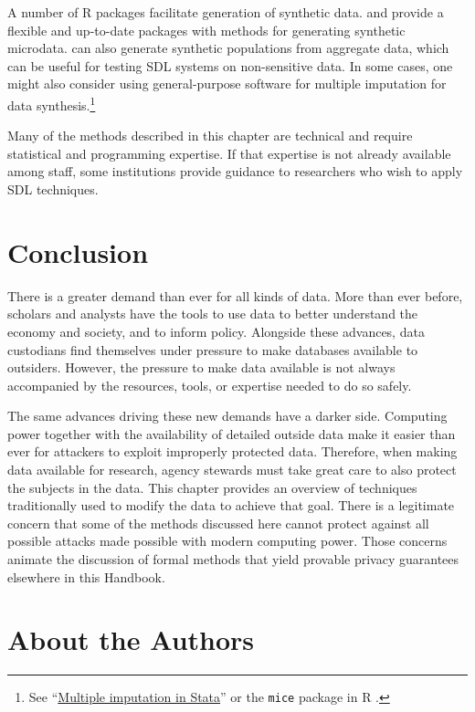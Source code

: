 \documentclass[
]{book}
\begin{document}
A number of R packages facilitate generation of synthetic data. \citet{raab_practical_2016} and \citet{nowok_synthpop_2016} provide a flexible and up-to-date packages with methods for generating synthetic microdata. \citet{templ_simpop_2019} can also generate synthetic populations from aggregate data, which can be useful for testing SDL systems on non-sensitive data. In some cases, one might also consider using general-purpose software for multiple imputation for data synthesis.\footnote{See ``\href{https://stats.idre.ucla.edu/stata/seminars/mi_in_stata_pt1_new/}{Multiple imputation in Stata}'' or the \texttt{mice} package in R \citep{buuren_mice_2011}.}

Many of the methods described in this chapter are technical and require statistical and programming expertise. If that expertise is not already available among staff, some institutions provide guidance to researchers who wish to apply SDL techniques.

\hypertarget{conclusion}{%
\section{Conclusion}\label{conclusion}}

There is a greater demand than ever for all kinds of data. More than ever before, scholars and analysts have the tools to use data to better understand the economy and society, and to inform policy. Alongside these advances, data custodians find themselves under pressure to make databases available to outsiders. However, the pressure to make data available is not always accompanied by the resources, tools, or expertise needed to do so safely.

The same advances driving these new demands have a darker side. Computing power together with the availability of detailed outside data make it easier than ever for attackers to exploit improperly protected data. Therefore, when making data available for research, agency stewards must take great care to also protect the subjects in the data. This chapter provides an overview of techniques traditionally used to modify the data to achieve that goal. There is a legitimate concern that some of the methods discussed here cannot protect against all possible attacks made possible with modern computing power. Those concerns animate the discussion of formal methods that yield provable privacy guarantees elsewhere in this Handbook.

\hypertarget{about-the-authors}{%
\section*{About the Authors}\label{about-the-authors}}
\end{document}
